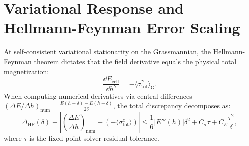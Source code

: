 \section{Variational Response and Hellmann-Feynman Error Scaling}
\label{sec:m1_4_5_variational_response}

At self-consistent variational stationarity on the Grassmannian, the Hellmann-Feynman theorem dictates that the field derivative equals the physical total magnetization:
\begin{equation}
\label{eq:m1_4_5_hellmann_feynman_identity}
\frac{\dd E_{\mathrm{cell}}}{\dd h^\gamma} = -\langle \sigma_{\mathrm{tot}}^\gamma \rangle_{\mathrm{G}}.
\end{equation}
When computing numerical derivatives via central differences $(\Delta E / \Delta h)_{\mathrm{num}} = \frac{E(h + \delta) - E(h - \delta)}{2\delta}$, the total discrepancy decomposes as:
\begin{equation}
\label{eq:m1_4_5_central_diff_error}
\Delta_{\mathrm{HF}}(\delta) \equiv \left| \left(\frac{\Delta E}{\Delta h}\right)_{\mathrm{num}} - (-\langle \sigma_{\mathrm{tot}}^z \rangle) \right| \le \frac{1}{6} |E'''(h)| \delta^2 + C_\sigma \tau + C_E \frac{\tau^2}{\delta},
\end{equation}
where $\tau$ is the fixed-point solver residual tolerance.

\begin{table}[htbp]
\centering
\caption{Hellmann-Feynman numerical error scaling vs step size $\delta$ (\texttt{hellmann\_feynman\_scaling.dat}).}
\label{tab:m1_4_5_hellmann_feynman}
\vspace{2mm}
\end{table}

